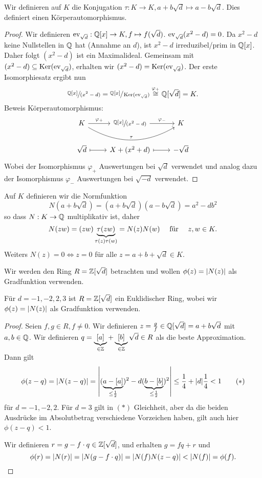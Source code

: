 Wir definieren auf $K$ die Konjugation $\tau: K \to K, a+ b\sqrt{d} \mapsto a- b \sqrt{d}$.
Dies definiert einen Körperautomorphismus.

\begin{proof}
	Wir definieren $\operatorname{ev}_{\sqrt{d}}: \mathbb{Q}[x] \to K, f \mapsto f(\sqrt{d})$.
	$\operatorname{ev}_{\sqrt{d}}(x^2-d) = 0$.
	Da $x^2-d$ keine Nullstellen in $\mathbb{Q}$ hat (Annahme an $d$), ist $x^2-d$ irreduzibel/prim in $\mathbb{Q}[x]$.
	Daher folgt $(x^2-d)$ ist ein Maximalideal.
	Gemeinsam mit $(x^2-d) \subseteq \operatorname{Ker}(\operatorname{ev}_{\sqrt{d}})$, erhalten wir $(x^2-d) = \operatorname{Ker}(\operatorname{ev}_{\sqrt{d}})$.
	Der erste Isomorphiesatz ergibt nun
	\[
		\sfrac{\mathbb{Q}[x]}{(x^2-d)} = \sfrac{\mathbb{Q}[x]}{\operatorname{Ker}(\operatorname{ev}_{\sqrt{d}})} \stackrel{\varphi_{+}}{\cong} \mathbb{Q}[\sqrt{d}] = K
	.\]
	Beweis Körperautomorphismus:
	\[
		\begin{tikzcd}
			K \arrow[r, "\varphi_{+}"] \arrow[rr, "\tau", bend right] & {\sfrac{\Q[x]}{(x^2-d)}} \arrow[r, "\varphi_{-}"] & K         \\
			\sqrt{d} \arrow[r, maps to]                                & X+(x^2+d) \arrow[r, maps to]                       & -\sqrt{d}
		\end{tikzcd}
	\]
	Wobei der Isomorphismus $\varphi_{+}$ Auswertungen bei $\sqrt{d}$ verwendet und analog
	dazu der Isomorphismus $\varphi_{-}$ Auswertungen bei $\sqrt{-d}$ verwendet.
\end{proof}


Auf $K$ definieren wir die Normfunktion
\[
	N(a+b \sqrt{d} ) = (a+b \sqrt{d} )(a-b \sqrt{d}) = a^2 - d b^2 
\]
so dass $N : K \to \mathbb{Q}$ multiplikativ ist, daher 
\[
	N(zw) = (zw) \underbrace{\tau(zw)}_{\tau(z) \tau(w)} = N(z) N(w) \qq{ für } z,w \in K
.\] 
Weiters $N(z) = 0 \Leftrightarrow z = 0$ für alle $z = a + b + \sqrt{d} \in K $.

Wir werden den Ring $R = \mathbb{Z}[\sqrt{d}]$ betrachten und wollen $\phi(z) = \abs{N(z)}$ als Gradfunktion verwenden.

\begin{theorem}
	Für $d = -1, -2, 2, 3$ ist  $R = \mathbb{Z}[\sqrt{d}]$ ein Euklidischer Ring, wobei wir $\phi(z) = \abs{N(z)}$ als Gradfunktion verwenden.
\end{theorem}

\begin{proof}
	Seien $f,g \in R, f \neq 0$. Wir definieren $z = \frac{g}{f} \in \mathbb{Q}[\sqrt{d}] = a+b \sqrt{d}$ mit $a,b \in \mathbb{Q}$.
	Wir definieren $q = \underbrace{[a]}_{\in \mathbb{Z}} + \underbrace{[b]}_{\in \mathbb{Z}} \sqrt{d} \in R$ als die beste Approximation.
	Dann gilt 
	\begin{align*}
		\phi(z-q) = \abs{N(z-q)} = \abs{(\underbrace{a-[a]}_{\leq \frac{1}{2}})^2 - d (\underbrace{b-[b]}_{\leq \frac{1}{2}})^2 } \leq \frac{1}{4} + \abs{d} \frac{1}{4} < 1 \tag{$*$}
	\end{align*}
	für $d = -1,-2,2$.
	Für $d = 3$ gilt in $(*)$ Gleichheit, aber da die beiden Ausdrücke im Absolutbetrag verschiedene Vorzeichen haben,
	gilt auch hier $\phi(z-q) < 1$.

	Wir definieren $r = g - f \cdot q \in \mathbb{Z}[\sqrt{d}]$, und erhalten $g = fq + r$ und 
	\[
		\phi(r) = \abs{N(r)} = \abs{N(g-f\cdot q) } = \abs{N(f) N(z-q)} < \abs{N(f)} = \phi(f)
	.\] 
\end{proof}


